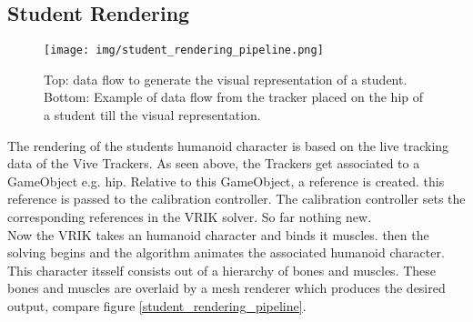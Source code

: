 \subsection{Student Rendering}
\begin{figure}
	\centering
	\texttt{[image: img/student\_rendering\_pipeline.png]}
	\caption{Top: data flow to generate the visual representation of a student. Bottom: Example of data flow from the tracker placed on the hip of a student till the visual representation.}
	\label{fig:student_rendering_pipeline}
\end{figure}
The rendering of the students humanoid character is based on the live tracking data of the Vive Trackers. As seen above, the Trackers get associated to a GameObject e.g. hip. Relative to this GameObject, a reference is created. this reference is passed to the calibration controller. The calibration controller sets the corresponding references in the VRIK solver. So far nothing new.\\
Now the VRIK takes an humanoid character and binds it muscles. then the solving begins and the algorithm animates the associated humanoid character. This character itsself consists out of a hierarchy of bones and muscles. These bones and muscles are overlaid by a mesh renderer which produces the desired output, compare figure \ref{student_rendering_pipeline}.
